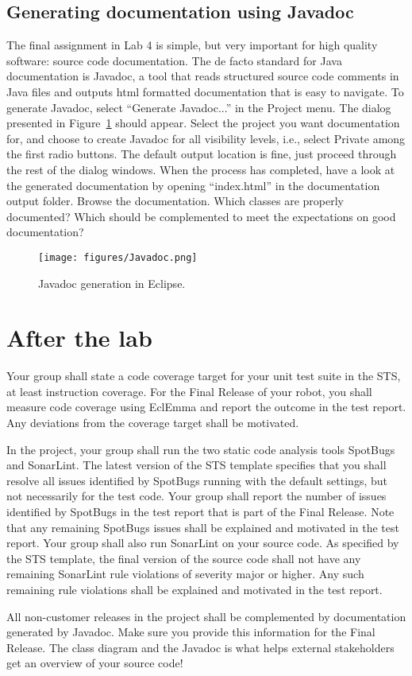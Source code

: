 \documentclass{scrreprt}
\begin{document}
\section{Generating documentation using Javadoc}
The final assignment in Lab 4 is simple, but very important for high quality software: source code documentation. The de facto standard for Java documentation is Javadoc, a tool that reads structured source code comments in Java files and outputs html formatted documentation that is easy to navigate. To generate Javadoc, select ``Generate Javadoc...'' in the Project menu. The dialog presented in Figure~\ref{fig:javadoc} should appear. Select the project you want documentation for, and choose to create Javadoc for all visibility levels, i.e., select Private among the first radio buttons. The default output location is fine, just proceed through the rest of the dialog windows. When the process has completed, have a look at the generated documentation by opening ``index.html'' in the documentation output folder. Browse the documentation. Which classes are properly documented? Which should be complemented to meet the expectations on good documentation?

\begin{figure}
\centering
\texttt{[image: figures/Javadoc.png]}
\caption{Javadoc generation in Eclipse.}
\label{fig:javadoc}
\end{figure}

\chapter{After the lab}
Your group shall state a code coverage target for your unit test suite in the STS, at least instruction coverage. For the Final Release of your robot, you shall measure code coverage using EclEmma and report the outcome in the test report. Any deviations from the coverage target shall be motivated.

In the project, your group shall run the two static code analysis tools SpotBugs and SonarLint. The latest version of the STS template specifies that you shall resolve all issues identified by SpotBugs running with the default settings, but not necessarily for the test code. Your group shall report the number of issues identified by SpotBugs in the test report that is part of the Final Release. Note that any remaining SpotBugs issues shall be explained and motivated in the test report. Your group shall also run SonarLint on your source code. As specified by the STS template, the final version of the source code shall not have any remaining SonarLint rule violations of severity major or higher. Any such remaining rule violations shall be explained and motivated in the test report.

All non-customer releases in the project shall be complemented by documentation generated by Javadoc. Make sure you provide this information for the Final Release. The class diagram and the Javadoc is what helps external stakeholders get an overview of your source code!
\end{document}

